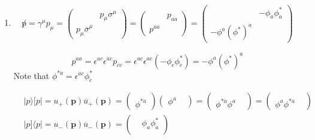 \documentclass[twoside]{amsart}
\begin{document}
\begin{enumerate}
\item[(a)]
\[
\not p = \gamma^{\mu} p_{\mu} = \left( \begin{matrix} & p_{\mu} \sigma^{\mu} \\ p_{\mu} \overline{\sigma}^{\mu} & \end{matrix} \right) = \left( \begin{matrix} & p_{a \dot{a}} \\ p^{\dot{a} a } & \end{matrix} \right) = \left( \begin{matrix} & - \phi_a \phi_{\dot{a}}^* \\ - \phi^a (\phi^*)^{\dot{a}} & \end{matrix} \right)
\]

\[
p^{\dot{a} a} = \epsilon^{ac} \epsilon^{\dot{a} \dot{c}} p_{c \dot{c}} = \epsilon^{ac} \epsilon^{\dot{a} \dot{c}} (- \phi_c \phi^*_{\dot{c}} ) = - \phi^a (\phi^*)^{\dot{a}}
\]
Note that $\phi^{ *\dot{a}} = \epsilon^{\dot{a} \dot{c}} \phi^*_{\dot{c}}$

\[
\begin{aligned}
   & | p \rangle [ p | = u_+(\mathbf{p}) \overline{u}_+(\mathbf{p}) = \left( \begin{matrix} \quad \\ \phi^{* \dot{a}} \end{matrix} \right) ( \begin{matrix} \phi^a &  \end{matrix} ) = \left( \begin{matrix} & \\ \phi^{ * \dot{a}} \phi^a & \end{matrix} \right) = \left( \begin{matrix} & \\ \phi^a \phi^{* \dot{a}} & \end{matrix} \right) \\ 
&  | p ] \langle p | = u_-(\mathbf{p}) \overline{u}_-(\mathbf{p}) =\left( \begin{matrix} & \phi_a \phi_{\dot{a}}^* \\ & \end{matrix} \right)
\end{aligned}
\]


\end{enumerate}
\end{document}
